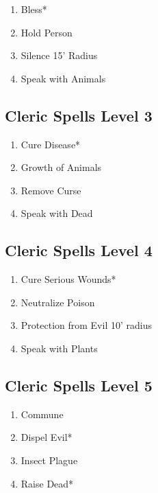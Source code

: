 \begin{enumerate}
\def\labelenumi{\arabic{enumi}.}
\tightlist
\item
  Bless*
\item
  Hold Person
\item
  Silence 15' Radius
\item
  Speak with Animals
\end{enumerate}

\subsection{Cleric Spells Level 3}\label{cleric-spells-level-3}

\begin{enumerate}
\def\labelenumi{\arabic{enumi}.}
\tightlist
\item
  Cure Disease*
\item
  Growth of Animals
\item
  Remove Curse
\item
  Speak with Dead
\end{enumerate}

\subsection{Cleric Spells Level 4}\label{cleric-spells-level-4}

\begin{enumerate}
\def\labelenumi{\arabic{enumi}.}
\tightlist
\item
  Cure Serious Wounds*
\item
  Neutralize Poison
\item
  Protection from Evil 10' radius
\item
  Speak with Plants
\end{enumerate}

\subsection{Cleric Spells Level 5}\label{cleric-spells-level-5}

\begin{enumerate}
\def\labelenumi{\arabic{enumi}.}
\tightlist
\item
  Commune
\item
  Dispel Evil*
\item
  Insect Plague
\item
  Raise Dead*
\end{enumerate}

